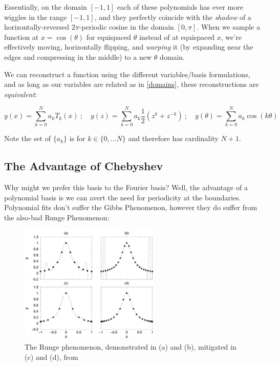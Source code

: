 \documentclass[10pt]{article}
\begin{document}
Essentially, on the domain $[-1, 1]$ each of these polynomials has ever more wiggles in the range $[-1, 1]$, and they perfectly coincide with the \textit{shadow} of a horizontally-reversed $2\pi$-periodic cosine in the domain $[0, \pi]$. When we sample a function at $x = \cos(\theta)$ for equispaced $\theta$ instead of at equispaced $x$, we're effectively moving, horizontally flipping, and \textit{warping} it (by expanding near the edges and compressing in the middle) to a new $\theta$ domain.

We can reconstruct a function using the different variables/basis formulations, and as long as our variables are related as in \autoref{domains}, these reconstructions are \textit{equivalent}:

\begin{equation}\label{equivalent}
y(x) = \sum_{k=0}^N a_k T_k(x)\ ;\quad y(z) = \sum_{k=0}^N a_k \frac{1}{2}(z^k + z^{-k})\ ;\quad y(\theta) = \sum_{k=0}^N a_k \cos(k \theta)
\end{equation}

Note the set of $\{a_k\}$ is for $k \in \{0, ... N\}$ and therefore has cardinality $N+1$.

\subsection{The Advantage of Chebyshev}

Why might we prefer this basis to the Fourier basis? Well, the advantage of a polynomial basis is we can avert the need for periodicity at the boundaries. Polynomial fits don't suffer the Gibbs Phenomenon, however they do suffer from the also-bad Runge Phenomenon\cite{kutz}:

\begin{figure}[h!]
	\centering
	\includegraphics[width=0.6\textwidth]{runge.png}
	\captionsetup{width=0.6\textwidth}
	\caption*{The Runge phenomenon, demonstrated in (a) and (b), mitigated in (c) and (d), from \cite{kutz}}
\end{figure}
\end{document}
